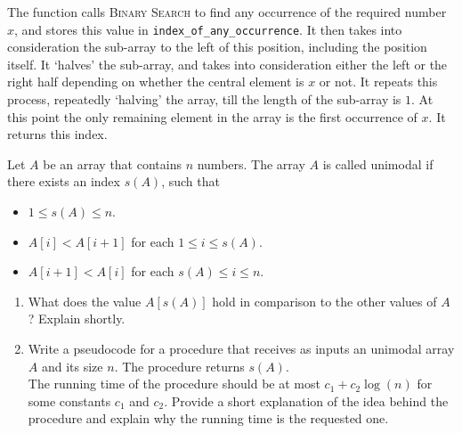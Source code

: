\documentclass[fleqn, a4paper, 11pt, oneside]{amsart}
\theoremstyle{definition}
\theoremstyle{theorem}
\begin{document}
\begin{solution}
	\begin{algorithm}
		\begin{algorithmic}[1]
			\Statex
				\EndIf
					\Else
					\EndIf
				\EndWhile
			\EndFunction
		\end{algorithmic}
		\caption{}
	\end{algorithm}
	The function calls \textsc{Binary Search} to find any occurrence of the required number $x$, and stores this value in \texttt{index\_of\_any\_occurrence}.
	It then takes into consideration the sub-array to the left of this position, including the position itself.
	It `halves' the sub-array, and takes into consideration either the left or the right half depending on whether the central element is $x$ or not.
	It repeats this process, repeatedly `halving' the array, till the length of the sub-array is $1$.
	At this point the only remaining element in the array is the first occurrence of $x$.
	It returns this index.
\end{solution}

\begin{question}
	Let $A$ be an array that contains $n$ numbers.
	The array $A$ is called unimodal if there exists an index $s(A)$, such that
	\begin{itemize}
		\item $1 \le s(A) \le n$.
		\item $A[i] < A[i + 1]$ for each $1 \le i \le s(A)$.
		\item $A[i + 1] < A[i]$ for each $s(A) \le i \le n$.
	\end{itemize}
	\begin{enumerate}
		\item
			What does the value $A[s(A)]$ hold in comparison to the other values of $A$?
			Explain shortly.
		\item
			Write a pseudocode for a procedure that receives as inputs an unimodal array $A$ and its size $n$.
			The procedure returns $s(A)$.\\
			The running time of the procedure should be at most $c_1 + c_2 \log(n)$ for some constants $c_1$ and $c_2$.
			Provide a short explanation of the idea behind the procedure and explain why the running time is the requested one.
	\end{enumerate}
\end{question}
\end{document}
